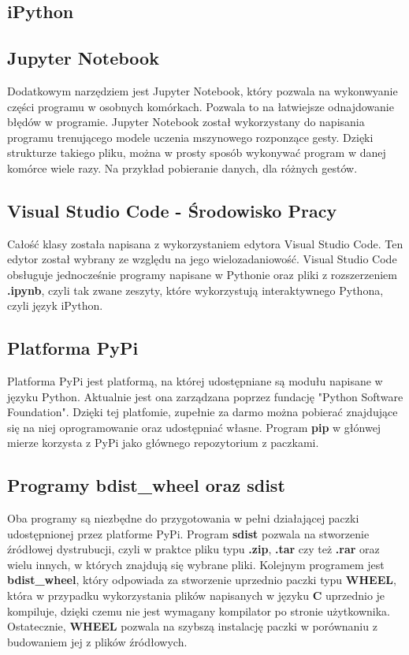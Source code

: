 \subsection{iPython}
\quad 

\subsection{Jupyter Notebook}
\quad Dodatkowym narzędziem jest Jupyter Notebook, który pozwala na wykonwyanie części programu w osobnych komórkach. Pozwala to na łatwiejsze odnajdowanie błędów w programie.
\quad Jupyter Notebook został wykorzystany do napisania programu trenującego modele uczenia mszynowego rozponzące gesty. Dzięki strukturze takiego pliku, można w prosty sposób wykonywać program w danej komórce wiele razy. Na przykład pobieranie danych, dla różnych gestów. 

\subsection{Visual Studio Code - Środowisko Pracy}
\quad Całość klasy została napisana z wykorzystaniem edytora Visual Studio Code. Ten edytor został wybrany ze względu na jego wielozadaniowość. Visual Studio Code obsługuje jednocześnie programy napisane w Pythonie oraz pliki z rozszerzeniem \textbf{.ipynb}, czyli tak zwane zeszyty, które wykorzystują interaktywnego Pythona, czyli język iPython. 

\subsection{Platforma PyPi}
\quad Platforma PyPi jest platformą, na której udostępniane są modułu napisane w języku Python. Aktualnie jest ona zarządzana poprzez fundację "Python Software Foundation". Dzięki tej platfomie, zupełnie za darmo można pobierać znajdujące się na niej oprogramowanie oraz udostępniać własne. Program \textbf{pip} w głónwej mierze korzysta z PyPi jako głównego repozytorium z paczkami. 

\subsection{Programy bdist\_wheel oraz sdist}
\quad Oba programy są niezbędne do przygotowania w pełni działającej paczki udostępnionej przez platforme PyPi. Program \textbf{sdist} pozwala na stworzenie źródłowej dystrubucji, czyli w praktce pliku typu \textbf{.zip}, \textbf{.tar} czy też \textbf{.rar} oraz wielu innych, w których znajdują się wybrane pliki. 
\quad Kolejnym programem jest \textbf{bdist\_wheel}, który odpowiada za stworzenie uprzednio paczki typu \textbf{WHEEL}, która w przypadku wykorzystania plików napisanych w języku \textbf{C} uprzednio je kompiluje, dzięki czemu nie jest wymagany kompilator po stronie użytkownika. Ostatecznie, \textbf{WHEEL} pozwala na szybszą instalację paczki w porównaniu z budowaniem jej z plików źródłowych. 




